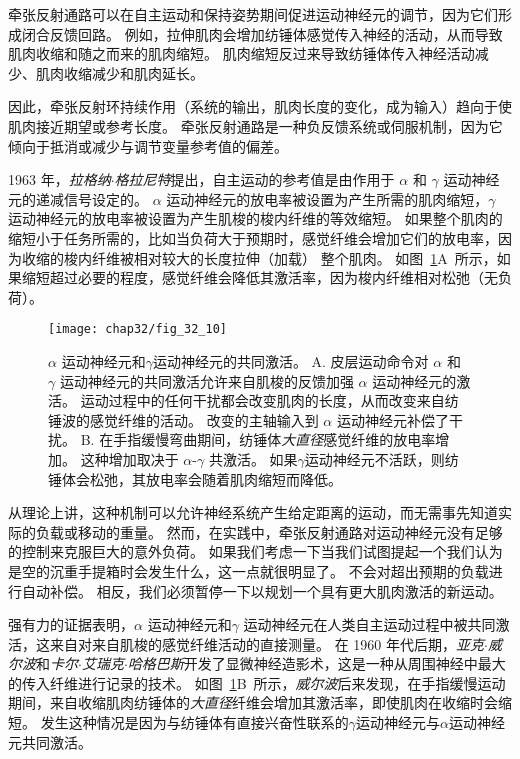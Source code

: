 牵张反射通路可以在自主运动和保持姿势期间促进运动神经元的调节，因为它们形成闭合反馈回路。
例如，拉伸肌肉会增加纺锤体感觉传入神经的活动，从而导致肌肉收缩和随之而来的肌肉缩短。
肌肉缩短反过来导致纺锤体传入神经活动减少、肌肉收缩减少和肌肉延长。


因此，牵张反射环持续作用（系统的输出，肌肉长度的变化，成为输入）趋向于使肌肉接近期望或参考长度。
牵张反射通路是一种负反馈系统或伺服机制，因为它倾向于抵消或减少与调节变量参考值的偏差。


1963 年，\textit{拉格纳$\cdot$格拉尼特}提出，自主运动的参考值是由作用于 $ \alpha $ 和 $ \gamma $ 运动神经元的递减信号设定的。
$ \alpha $ 运动神经元的放电率被设置为产生所需的肌肉缩短，$ \gamma $ 运动神经元的放电率被设置为产生肌梭的梭内纤维的等效缩短。
如果整个肌肉的缩短小于任务所需的，比如当负荷大于预期时，感觉纤维会增加它们的放电率，因为收缩的梭内纤维被相对较大的长度拉伸（加载） 整个肌肉。
如图~\ref{fig:32_10}A~所示，如果缩短超过必要的程度，感觉纤维会降低其激活率，因为梭内纤维相对松弛（无负荷）。


\begin{figure}[htbp]
	\centering
	\texttt{[image: chap32/fig\_32\_10]}
	\caption{$ \alpha $ 运动神经元和$ \gamma $运动神经元的共同激活。
	A. 皮层运动命令对 $ \alpha $ 和 $ \gamma $ 运动神经元的共同激活允许来自肌梭的反馈加强 $ \alpha $ 运动神经元的激活。
	运动过程中的任何干扰都会改变肌肉的长度，从而改变来自纺锤波的感觉纤维的活动。
	改变的主轴输入到 $ \alpha $ 运动神经元补偿了干扰。
	B. 在手指缓慢弯曲期间，纺锤体\textit{大直径}感觉纤维的放电率增加。
	这种增加取决于 $ \alpha $-$ \gamma $ 共激活。
	如果$ \gamma $运动神经元不活跃，则纺锤体会松弛，其放电率会随着肌肉缩短而降低\cite{vallbo1981basic}。}
	\label{fig:32_10}
\end{figure}


从理论上讲，这种机制可以允许神经系统产生给定距离的运动，而无需事先知道实际的负载或移动的重量。
然而，在实践中，牵张反射通路对运动神经元没有足够的控制来克服巨大的意外负荷。
如果我们考虑一下当我们试图提起一个我们认为是空的沉重手提箱时会发生什么，这一点就很明显了。
不会对超出预期的负载进行自动补偿。
相反，我们必须暂停一下以规划一个具有更大肌肉激活的新运动。


强有力的证据表明，$ \alpha $ 运动神经元和$ \gamma $ 运动神经元在人类自主运动过程中被共同激活，这来自对来自肌梭的感觉纤维活动的直接测量。
在 1960 年代后期，\textit{亚克$\cdot$威尔波}和\textit{卡尔$\cdot$艾瑞克$\cdot$哈格巴斯}开发了显微神经造影术，这是一种从周围神经中最大的传入纤维进行记录的技术。
如图~\ref{fig:32_10}B~所示，\textit{威尔波}后来发现，在手指缓慢运动期间，来自收缩肌肉纺锤体的\textit{大直径}纤维会增加其激活率，即使肌肉在收缩时会缩短。
发生这种情况是因为与纺锤体有直接兴奋性联系的$ \gamma $运动神经元与$ \alpha $运动神经元共同激活。


